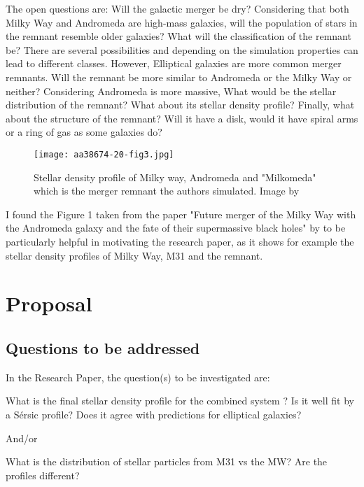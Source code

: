 \documentclass[linenumbers, preprint, times]{aastex631}
\begin{document}
The open questions are: Will the galactic merger be dry? Considering that both Milky Way and Andromeda are high-mass galaxies, will the population of stars in the remnant resemble older galaxies?
What will the classification of the remnant be? There are several possibilities and depending on the simulation properties can lead to different classes. However, Elliptical galaxies are more common merger remnants.
Will the remnant be more similar to Andromeda or the Milky Way or neither? Considering Andromeda is more massive, What would be the stellar distribution of the remnant? What about its stellar density profile? Finally, what about the structure of the remnant? Will it have a disk, would it have spiral arms or a ring of gas as some galaxies do? 
\begin{figure}
    \centering
    \texttt{[image: aa38674-20-fig3.jpg]}
    \caption{Stellar density profile of Milky way, Andromeda and "Milkomeda" which is the merger remnant the authors simulated. Image by \citet{Schiavi_2020} }
    \label{fig:galaxy}
\end{figure}
\par I found the Figure 1 taken from the paper "Future merger of the Milky Way with the Andromeda galaxy and the fate of their supermassive black holes" by \citet{Schiavi_2020} to be particularly helpful in motivating the research paper, as it shows for example the stellar density profiles of Milky Way, M31 and the remnant. 
\section{Proposal} \label{sec:style}
\subsection{Questions to be addressed}
In the Research Paper, the question(s) to be investigated are:\par
What is the final stellar density profile for the combined system ? Is it well fit by
a Sérsic profile? Does it agree with predictions for elliptical galaxies?\par
And/or \par
What is the distribution of stellar particles from M31 vs the MW? Are the profiles
different? \par
\end{document}
